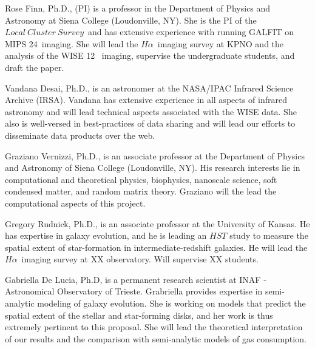 \documentclass[11pt, preprint]{aastex}
\newcommand{\ha}{$H\alpha$}
\newcommand{\lcs}{$Local \ Cluster \ Survey $}
\begin{document}
{Rose Finn, Ph.D., (PI) is a professor in the Department of Physics
and Astronomy at Siena College (Loudonville, NY).  She is the PI of
the \lcs \ and has extensive experience with running GALFIT on MIPS
24\micron \ imaging.  She will lead the \ha \ imaging survey at KPNO
and the analysis of the WISE 12\micron
\ imaging, supervise the undergraduate students, and draft the paper.

Vandana Desai, Ph.D., is an astronomer at the NASA/IPAC Infrared
  Science Archive (IRSA).   Vandana has extensive experience
in all aspects of infrared astronomy and will lead technical aspects
associated with the WISE data.  
She also is well-versed in best-practices of data sharing and will
lead our efforts to disseminate data products over the web.

Graziano Vernizzi, Ph.D., is an associate professor at the Department of
Physics and Astronomy of Siena College (Loudonville, NY).
His research interests lie in computational and theoretical
physics, biophysics, nanoscale science, soft condensed matter, and
random matrix theory. 
Graziano will the lead the computational
aspects of this project.

Gregory Rudnick, Ph.D., is an associate professor at the University of
Kansas.  He has expertise in galaxy evolution, and he is leading an
$HST$ study to measure the spatial extent of star-formation in
intermediate-redshift galaxies.  He will lead the \ha \ imaging survey
at XX observatory.   Will supervise XX students.


Gabriella De Lucia, Ph.D, is a permanent research scientist at INAF -
Astronomical Observatory of Trieste.  Grabriella provides expertise in
semi-analytic modeling of galaxy evolution. She is working on models
that predict the spatial extent of the stellar and star-forming disks,
and her work is thus extremely pertinent to this proposal.  She will lead
the theoretical interpretation of our results and the comparison
with semi-analytic models of gas consumption.

}
\end{document}
